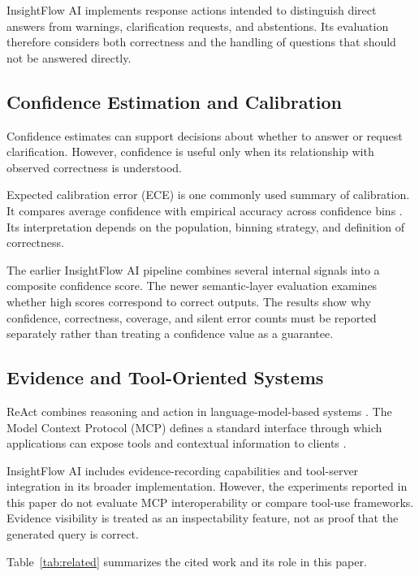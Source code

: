 \documentclass[conference]{IEEEtran}
\begin{document}
InsightFlow AI implements response actions intended to distinguish direct answers from warnings, clarification requests, and abstentions. Its evaluation therefore considers both correctness and the handling of questions that should not be answered directly.

\subsection{Confidence Estimation and Calibration}

Confidence estimates can support decisions about whether to answer or request clarification. However, confidence is useful only when its relationship with observed correctness is understood.

Expected calibration error (ECE) is one commonly used summary of calibration. It compares average confidence with empirical accuracy across confidence bins \cite{naeini2015bbq}. Its interpretation depends on the population, binning strategy, and definition of correctness.

The earlier InsightFlow AI pipeline combines several internal signals into a composite confidence score. The newer semantic-layer evaluation examines whether high scores correspond to correct outputs. The results show why confidence, correctness, coverage, and silent error counts must be reported separately rather than treating a confidence value as a guarantee.

\subsection{Evidence and Tool-Oriented Systems}

ReAct combines reasoning and action in language-model-based systems \cite{yao2023react}. The Model Context Protocol (MCP) defines a standard interface through which applications can expose tools and contextual information to clients \cite{mcp}.

InsightFlow AI includes evidence-recording capabilities and tool-server integration in its broader implementation. However, the experiments reported in this paper do not evaluate MCP interoperability or compare tool-use frameworks. Evidence visibility is treated as an inspectability feature, not as proof that the generated query is correct.

Table~\ref{tab:related} summarizes the cited work and its role in this paper.
\end{document}

